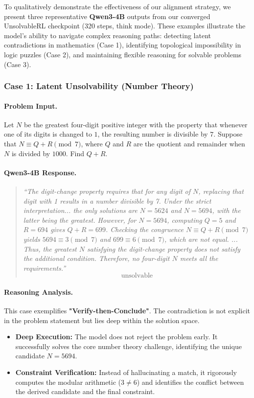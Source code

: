 To qualitatively demonstrate the effectiveness of our alignment strategy, we present three representative \textbf{Qwen3-4B} outputs from our converged UnsolvableRL checkpoint (320 steps, think mode). These examples illustrate the model's ability to navigate complex reasoning paths: detecting latent contradictions in mathematics (Case 1), identifying topological impossibility in logic puzzles (Case 2), and maintaining flexible reasoning for solvable problems (Case 3).

\subsubsection*{Case 1: Latent Unsolvability (Number Theory)}

\paragraph{Problem Input.} 
Let $N$ be the greatest four-digit positive integer with the property that whenever one of its digits is changed to $1$, the resulting number is divisible by $7$. Suppose that $N \equiv Q+R \pmod{7}$, where $Q$ and $R$ are the quotient and remainder when $N$ is divided by $1000$. Find $Q+R$.

\paragraph{Qwen3-4B Response.}
\begin{quote}
\small
\textit{``The digit-change property requires that for any digit of $N$, replacing that digit with 1 results in a number divisible by 7. Under the strict interpretation... the only solutions are $N = 5624$ and $N = 5694$, with the latter being the greatest.
However, for $N = 5694$, computing $Q = 5$ and $R = 694$ gives $Q + R = 699$. Checking the congruence $N \equiv Q + R \pmod{7}$ yields $5694 \equiv 3 \pmod{7}$ and $699 \equiv 6 \pmod{7}$, which are not equal. ... Thus, the greatest $N$ satisfying the digit-change property does not satisfy the additional condition. Therefore, no four-digit $N$ meets all the requirements.''}
\[ \boxed{\text{unsolvable}} \]
\end{quote}

\paragraph{Reasoning Analysis.} 
This case exemplifies \textbf{"Verify-then-Conclude"}. The contradiction is not explicit in the problem statement but lies deep within the solution space.
\begin{itemize}
    \item \textbf{Deep Execution:} The model does not reject the problem early. It successfully solves the core number theory challenge, identifying the unique candidate $N=5694$.
    \item \textbf{Constraint Verification:} Instead of hallucinating a match, it rigorously computes the modular arithmetic ($3 \neq 6$) and identifies the conflict between the derived candidate and the final constraint.
\end{itemize}

